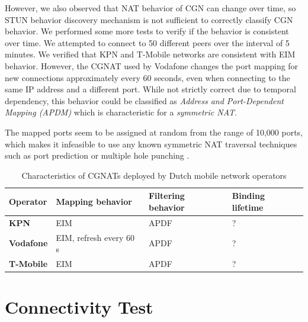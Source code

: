 However, we also observed that NAT behavior of CGN can change over time, so STUN behavior discovery mechanism is not sufficient to correctly classify CGN behavior. We performed some more tests to verify if the behavior is consistent over time. We attempted to connect to 50 different peers over the interval of 5 minutes. We verified that KPN and T-Mobile networks are consistent with EIM behavior. However, the CGNAT used by Vodafone changes the port mapping for new connections approximately every 60 seconds, even when connecting to the same IP address and a different port. While not strictly correct due to temporal dependency, this behavior could be classified as \textit{Address and Port-Dependent Mapping (APDM)} which is characteristic for a \textit{symmetric NAT}.

The mapped ports seem to be assigned at random from the range of 10,000 ports, which makes it infeasible to use any known symmetric NAT traversal techniques such as port prediction or multiple hole punching \cite{multihole}\cite{takeda}.



\begin{table}[h!]
    \centering
    \begin{tabular}{ | l | l | l | l | }
        \hline
        \textbf{Operator} & \textbf{Mapping behavior} & \textbf{Filtering behavior} & \textbf{Binding lifetime} \\
        \hline
        \textbf{KPN} & EIM & APDF & ? \\
        \textbf{Vodafone} & EIM, refresh every 60 s & APDF & ? \\
        \textbf{T-Mobile} & EIM & APDF & ? \\
        \hline
    \end{tabular}
    \caption{Characteristics of CGNATs deployed by Dutch mobile network operators}
    \label{table_cgnat_analysis}
\end{table}




\section{Connectivity Test}

